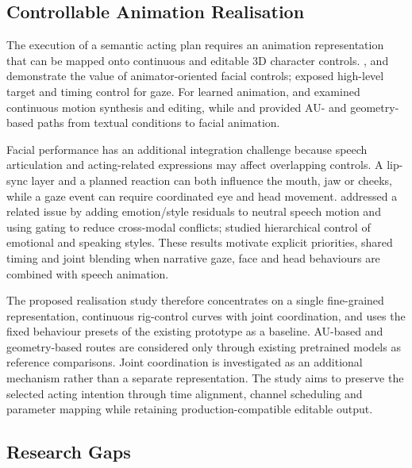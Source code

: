 \documentclass[11pt,a4paper]{article}
\begin{document}
\subsection{Controllable Animation Realisation}

The execution of a semantic acting plan requires an animation representation that can be mapped onto continuous and editable 3D character controls. \citet{edwards2016jali}, \citet{zhou2018visemenet} and \citet{choi2022animatomy} demonstrate the value of animator-oriented facial controls; \citet{pejsa2016authoring} exposed high-level target and timing control for gaze. For learned animation, \citet{stan2023facediffuser} and \citet{thambiraja2025diface} examined continuous motion synthesis and editing, while \citet{durupinar2025prompt} and \citet{song2026tdmm} provided AU- and geometry-based paths from textual conditions to facial animation.

Facial performance has an additional integration challenge because speech articulation and acting-related expressions may affect overlapping controls. A lip-sync layer and a planned reaction can both influence the mouth, jaw or cheeks, while a gaze event can require coordinated eye and head movement. \citet{yang2026destalker} addressed a related issue by adding emotion/style residuals to neutral speech motion and using gating to reduce cross-modal conflicts; \citet{yang2026hiftalker} studied hierarchical control of emotional and speaking styles. These results motivate explicit priorities, shared timing and joint blending when narrative gaze, face and head behaviours are combined with speech animation.

The proposed realisation study therefore concentrates on a single fine-grained representation, continuous rig-control curves with joint coordination, and uses the fixed behaviour presets of the existing prototype as a baseline. AU-based and geometry-based routes are considered only through existing pretrained models as reference comparisons. Joint coordination is investigated as an additional mechanism rather than a separate representation. The study aims to preserve the selected acting intention through time alignment, channel scheduling and parameter mapping while retaining production-compatible editable output.

\subsection{Research Gaps}
\end{document}
